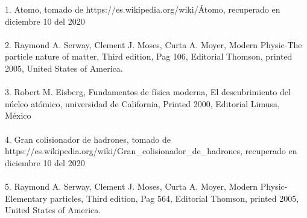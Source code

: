 \documentclass[%
 reprint,
 amsmath,amssymb,
 aps,
]{revtex4-2}
\begin{document}
1. Atomo, tomado de https://es.wikipedia.org/wiki/Átomo, recuperado en diciembre 10 del 2020\\
\\
2. Raymond A. Serway, Clement J. Moses, Curta A. Moyer, Modern Physic-The particle nature of matter, Third edition, Pag 106, Editorial Thomson, printed 2005, United States of America.\\
\\
3. Robert M. Eisberg, Fundamentos de física moderna, El descubrimiento del núcleo atómico, universidad de California, Printed 2000, Editorial Limusa, México\\
\\
4. Gran colisionador de hadrones, tomado de https://es.wikipedia.org/wiki/Gran\_colisionador\_de\_hadrones, recuperado en diciembre 10 del 2020\\
\\
5. Raymond A. Serway, Clement J. Moses, Curta A. Moyer, Modern Physic-Elementary particles, Third edition, Pag 564, Editorial Thomson, printed 2005, United States of America.
\\
\\
\\
\\
\\
\\
\\
\\
\\
\\
\\
\\
\\
\\
\\
\\
\\
\\
\\
\\
\\
\\
\\
\\
\\
\\
\\
\\
\\
\\
\\
\\
\\
\\
\\
\\
\\
\\
\\
\\
\\
\\
\end{document}
